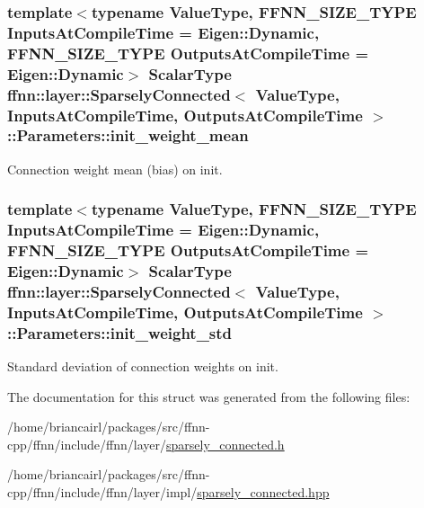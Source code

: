 \hypertarget{structffnn_1_1layer_1_1_sparsely_connected_1_1_parameters_a46e27cf05911e23f508a3447284fd3c7}{
\subsubsection[{init\-\_\-weight\-\_\-mean}]{\setlength{\rightskip}{0pt plus 5cm}template$<$typename Value\-Type, F\-F\-N\-N\-\_\-\-S\-I\-Z\-E\-\_\-\-T\-Y\-P\-E Inputs\-At\-Compile\-Time = Eigen\-::\-Dynamic, F\-F\-N\-N\-\_\-\-S\-I\-Z\-E\-\_\-\-T\-Y\-P\-E Outputs\-At\-Compile\-Time = Eigen\-::\-Dynamic$>$ {\bf Scalar\-Type} {\bf ffnn\-::layer\-::\-Sparsely\-Connected}$<$ Value\-Type, Inputs\-At\-Compile\-Time, Outputs\-At\-Compile\-Time $>$\-::Parameters\-::init\-\_\-weight\-\_\-mean}}\label{structffnn_1_1layer_1_1_sparsely_connected_1_1_parameters_a46e27cf05911e23f508a3447284fd3c7}


Connection weight mean (bias) on init. 

\hypertarget{structffnn_1_1layer_1_1_sparsely_connected_1_1_parameters_a50317b12cecff8ce1b6fa82874b28372}{
\subsubsection[{init\-\_\-weight\-\_\-std}]{\setlength{\rightskip}{0pt plus 5cm}template$<$typename Value\-Type, F\-F\-N\-N\-\_\-\-S\-I\-Z\-E\-\_\-\-T\-Y\-P\-E Inputs\-At\-Compile\-Time = Eigen\-::\-Dynamic, F\-F\-N\-N\-\_\-\-S\-I\-Z\-E\-\_\-\-T\-Y\-P\-E Outputs\-At\-Compile\-Time = Eigen\-::\-Dynamic$>$ {\bf Scalar\-Type} {\bf ffnn\-::layer\-::\-Sparsely\-Connected}$<$ Value\-Type, Inputs\-At\-Compile\-Time, Outputs\-At\-Compile\-Time $>$\-::Parameters\-::init\-\_\-weight\-\_\-std}}\label{structffnn_1_1layer_1_1_sparsely_connected_1_1_parameters_a50317b12cecff8ce1b6fa82874b28372}


Standard deviation of connection weights on init. 



The documentation for this struct was generated from the following files\-:\begin{DoxyCompactItemize}
\item 
/home/briancairl/packages/src/ffnn-\/cpp/ffnn/include/ffnn/layer/\hyperlink{sparsely__connected_8h}{sparsely\-\_\-connected.\-h}\item 
/home/briancairl/packages/src/ffnn-\/cpp/ffnn/include/ffnn/layer/impl/\hyperlink{layer_2impl_2sparsely__connected_8hpp}{sparsely\-\_\-connected.\-hpp}\end{DoxyCompactItemize}
